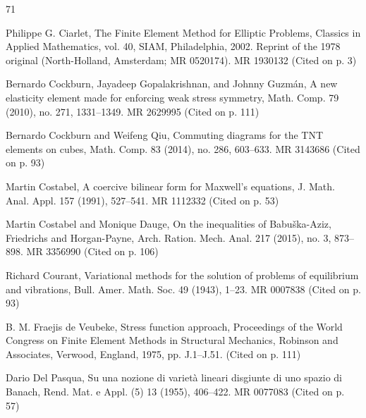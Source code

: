 \begin{MBSourceBibliography}{71}
\item\label{bib:source-31}Philippe G. Ciarlet, The Finite Element Method for Elliptic Problems, Classics in Applied Mathematics, vol. 40, SIAM, Philadelphia, 2002. Reprint of the 1978 original (North-Holland, Amsterdam; MR 0520174). MR 1930132 (Cited on p. 3)

\item\label{bib:source-32}Bernardo Cockburn, Jayadeep Gopalakrishnan, and Johnny Guzmán, A new elasticity element made for enforcing weak stress symmetry, Math. Comp. 79 (2010), no. 271, 1331–1349. MR 2629995 (Cited on p. 111)

\item\label{bib:source-33}Bernardo Cockburn and Weifeng Qiu, Commuting diagrams for the TNT elements on cubes, Math. Comp. 83 (2014), no. 286, 603–633. MR 3143686 (Cited on p. 93)

\item\label{bib:source-34}Martin Costabel, A coercive bilinear form for Maxwell’s equations, J. Math. Anal. Appl. 157 (1991), 527–541. MR 1112332 (Cited on p. 53)

\item\label{bib:source-35}Martin Costabel and Monique Dauge, \newline On the inequalities of Babuška-Aziz, Friedrichs and Horgan-Payne, Arch. Ration. Mech. Anal. 217 (2015), no. 3, 873– 898. MR 3356990 (Cited on p. 106)

\item\label{bib:source-36}Richard Courant, Variational methods for the solution of problems of equilibrium and vibrations, Bull. Amer. Math. Soc. 49 (1943), 1–23. MR 0007838 (Cited on p. 93)

\item\label{bib:source-37}B. M. Fraejis de Veubeke, Stress function approach, Proceedings of the World Congress on Finite Element Methods in Structural Mechanics, Robinson and Associates, Verwood, England, 1975, pp. J.1–J.51. (Cited on p. 111)

\item\label{bib:source-38}Dario Del Pasqua, Su una nozione di varietà lineari disgiunte di uno spazio di Banach, Rend. Mat. e Appl. (5) 13 (1955), 406–422. MR 0077083 (Cited on p. 57)


\end{MBSourceBibliography}
